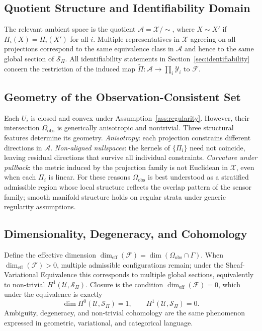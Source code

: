 \documentclass[12pt, oneside]{article}
\newcommand{\Ftil}{\widetilde{\Pi}}
\begin{document}
\subsection{Quotient Structure and Identifiability Domain}

The relevant ambient space is the quotient $\mathcal{A} = \mathcal{X}/{\sim}$, where
$X \sim X'$ if $\Pi_i(X) = \Pi_i(X')$ for all $i$. Multiple representatives in
$\mathcal{X}$ agreeing on all projections correspond to the same equivalence class in
$\mathcal{A}$ and hence to the same global section of $\mathcal{S}_\Pi$. All
identifiability statements in Section~\ref{sec:identifiability} concern the restriction
of the induced map $\Ftil : \mathcal{A} \to \prod_i \mathcal{Y}_i$ to $\mathcal{F}$.

\subsection{Geometry of the Observation-Consistent Set}

Each $U_i$ is closed and convex under Assumption~\ref{ass:regularity}. However, their
intersection $\Omega_{\mathrm{obs}}$ is generically anisotropic and nontrivial. Three
structural features determine its geometry. \emph{Anisotropy}: each projection
constrains different directions in $\mathcal{A}$. \emph{Non-aligned nullspaces}: the
kernels of $\{\Pi_i\}$ need not coincide, leaving residual directions that survive all
individual constraints. \emph{Curvature under pullback}: the metric induced by the
projection family is not Euclidean in $\mathcal{X}$, even when each $\Pi_i$ is linear.
For these reasons $\Omega_{\mathrm{obs}}$ is best understood as a stratified admissible
region whose local structure reflects the overlap pattern of the sensor family; smooth
manifold structure holds on regular strata under generic regularity assumptions.

\subsection{Dimensionality, Degeneracy, and Cohomology}

Define the effective dimension $\dim_{\mathrm{eff}}(\mathcal{F}) = \dim(\Omega_{\mathrm{obs}}
\cap \Gamma)$. When $\dim_{\mathrm{eff}}(\mathcal{F}) > 0$, multiple admissible
configurations remain; under the Sheaf-Variational Equivalence this corresponds to
multiple global sections, equivalently to non-trivial $H^1(\mathcal{U}, \mathcal{S}_\Pi)$.
Closure is the condition $\dim_{\mathrm{eff}}(\mathcal{F}) = 0$, which under the
equivalence is exactly
\[
\dim H^0(\mathcal{U}, \mathcal{S}_\Pi) = 1, \qquad H^1(\mathcal{U}, \mathcal{S}_\Pi) = 0.
\]
Ambiguity, degeneracy, and non-trivial cohomology are the same phenomenon expressed in
geometric, variational, and categorical language.
\end{document}
